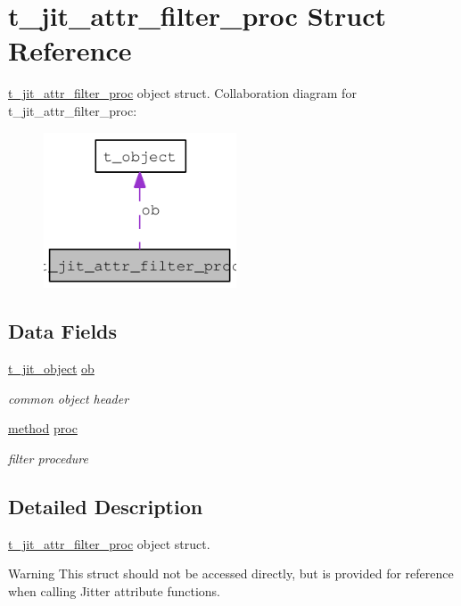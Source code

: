 \hypertarget{structt__jit__attr__filter__proc}{
\section{t\_\-jit\_\-attr\_\-filter\_\-proc Struct Reference}
\label{structt__jit__attr__filter__proc}
}


\hyperlink{structt__jit__attr__filter__proc}{t\_\-jit\_\-attr\_\-filter\_\-proc} object struct.  
Collaboration diagram for t\_\-jit\_\-attr\_\-filter\_\-proc:\nopagebreak
\begin{figure}[H]
\begin{center}
\leavevmode
\includegraphics[width=162pt]{structt__jit__attr__filter__proc__coll__graph}
\end{center}
\end{figure}
\subsection*{Data Fields}
\begin{DoxyCompactItemize}
\item 
\hypertarget{structt__jit__attr__filter__proc_a79f69525d5b163fe45d30878ab79c44e}{
\hyperlink{structt__object}{t\_\-jit\_\-object} \hyperlink{structt__jit__attr__filter__proc_a79f69525d5b163fe45d30878ab79c44e}{ob}}
\label{structt__jit__attr__filter__proc_a79f69525d5b163fe45d30878ab79c44e}

\begin{DoxyCompactList}\small\item\em common object header \item\end{DoxyCompactList}\item 
\hypertarget{structt__jit__attr__filter__proc_a711f7a21be172d54414eadc425eb55b1}{
\hyperlink{group__datatypes_gac26ba0a173b50597f5738132e059b42d}{method} \hyperlink{structt__jit__attr__filter__proc_a711f7a21be172d54414eadc425eb55b1}{proc}}
\label{structt__jit__attr__filter__proc_a711f7a21be172d54414eadc425eb55b1}

\begin{DoxyCompactList}\small\item\em filter procedure \item\end{DoxyCompactList}\end{DoxyCompactItemize}


\subsection{Detailed Description}
\hyperlink{structt__jit__attr__filter__proc}{t\_\-jit\_\-attr\_\-filter\_\-proc} object struct. \begin{DoxyWarning}{Warning}
This struct should not be accessed directly, but is provided for reference when calling Jitter attribute functions. 
\end{DoxyWarning}
